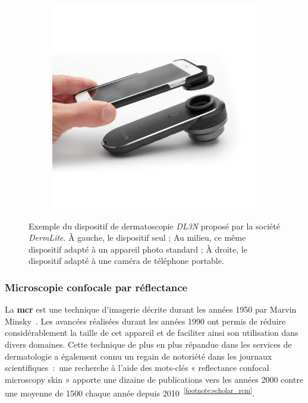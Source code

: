\begin{figure}[H]
\begin{subfigure}{.32\textwidth}
    \end{subfigure}
    \begin{subfigure}{.32\textwidth}
      \centering
      \includegraphics[width=\linewidth]{contents/chapter_2/resources/example_device_dermlite_3.png}
    \end{subfigure}
    \caption{Exemple du dispositif de dermatoscopie \textit{DL3N} proposé par la société \textit{DermLite}. À gauche, le dispositif seul ; Au milieu, ce même dispositif adapté à un appareil photo standard ; À droite, le dispositif adapté à une caméra de téléphone portable.}
    \label{fig:example_device_dermlite}
\end{figure}\par

\subsubsection{Microscopie confocale par réflectance}
La \textbf{\acrfull{mcr}} est une technique d’imagerie décrite durant les années 1950 par Marvin Minsky~\cite{Sheppard2019}. Les avancées réalisées durant les années 1990 ont permis de réduire considérablement la taille de cet appareil et de faciliter ainsi son utilisation dans divers domaines. Cette technique de plus en plus répandue dans les services de dermatologie a également connu un regain de notoriété dans les journaux scientifiques~:~une recherche à l’aide des mots-clés « reflectance confocal microscopy skin » apporte une dizaine de publications vers les années 2000 contre une moyenne de 1500 chaque année depuis 2010~\textsuperscript{\ref{footnote:scholar_rcm}}.\par

